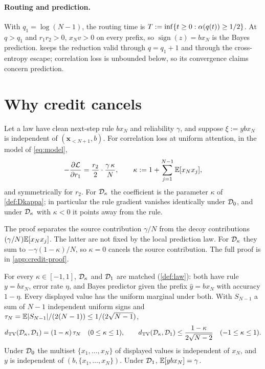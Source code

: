 \paragraph{Routing and prediction.}
With $q_1=\log(N-1)$, the routing time is $T:=\inf\{t\ge0:\alpha(q(t))\ge1/2\}$. At $q>q_1$ and $r_1r_2>0$, $x_N v>0$ on every prefix,
so $\operatorname{sign}(z)=b x_N$ is the Bayes prediction.  keeps the reduction valid through $q=q_1+1$ and through the cross-entropy escape;
correlation loss is unbounded below, so its convergence claims concern prediction.

\section{Why credit cancels}
\label{sec:cancel}

\begin{lemma}
\label{lem:credit}
Let a law have clean next-step rule $b x_N$ and reliability $\gamma$, and suppose $\xi:=y b x_N$ is independent of $(\bm x_{<N+1},b)$. For correlation loss at uniform attention, in the model of \cref{eq:model},
\[
 -\frac{\partial \mathcal L}{\partial r_1}=\frac{r_2}{2}\cdot\frac{\gamma\,\kappa}{N},
 \qquad
 \kappa:=1+\sum_{j=1}^{N-1}\mathbb E[x_N x_j],
\]
and symmetrically for $r_2$. For $\mathcal D_{\kappa}$ the coefficient is the parameter $\kappa$ of \cref{def:Dkappa}; in particular the rule gradient vanishes identically
under $\mathcal D_{0}$, and under $\mathcal D_{\kappa}$ with $\kappa<0$ it points away from the rule.
\end{lemma}

The proof separates the source contribution $\gamma/N$ from the decoy contributions
$(\gamma/N)\mathbb E[x_N x_j]$. The latter are not fixed by the local prediction law.
For $\mathcal D_{\kappa}$ they sum to $-\gamma(1-\kappa)/N$, so $\kappa=0$ cancels the source contribution.
The full proof is in \cref{app:credit-proof}.

\begin{lemma}
\label{lem:matched}
For every $\kappa\in[-1,1]$, $\mathcal D_{\kappa}$ and $\mathcal D_{1}$ are matched (\cref{def:law}): both have rule $y=b x_N$, error rate $\eta$,
and Bayes predictor given the prefix $\hat y=b x_N$ with accuracy $1-\eta$. Every displayed value has the uniform marginal under both.
With $S_{N-1}$ a sum of $N-1$ independent uniform signs and $\tau_N=\mathbb E|S_{N-1}|/(2(N-1))\le1/(2\sqrt{N-1})$,
\[
 d_{\mathrm{TV}}(\mathcal D_{\kappa},\mathcal D_{1})=(1-\kappa)\,\tau_N\quad(0\le\kappa\le1),\qquad
 d_{\mathrm{TV}}(\mathcal D_{\kappa},\mathcal D_{1})\le\frac{1-\kappa}{2\sqrt{N-2}}\quad(-1\le\kappa\le1).
\]
Under $\mathcal D_{0}$ the multiset $\{x_1,\ldots,x_N\}$ of displayed values is independent of $x_N$, and $y$ is independent of
$(b,\{x_1,\ldots,x_N\})$. Under $\mathcal D_{1}$, $\mathbb E[y b x_N]=\gamma$.
\end{lemma}

